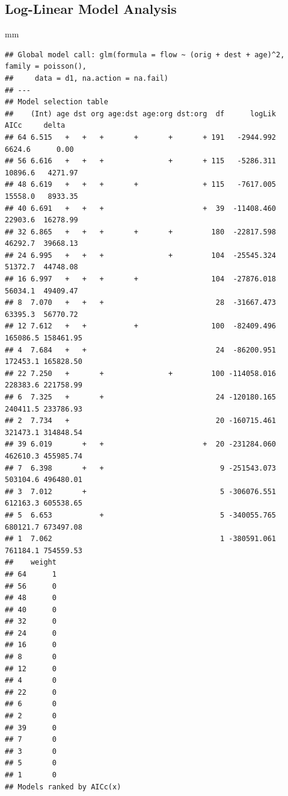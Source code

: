 \documentclass[
]{book}
\newenvironment{Shaded}{\begin{snugshade}}{\end{snugshade}}
\newcommand{\NormalTok}[1]{#1}
\begin{document}
\hypertarget{log-linear-model-analysis-5}{%
\subsection{Log-Linear Model Analysis}\label{log-linear-model-analysis-5}}

\begin{Shaded}
\begin{Highlighting}[]
\NormalTok{mm}
\end{Highlighting}
\end{Shaded}

\begin{verbatim}
## Global model call: glm(formula = flow ~ (orig + dest + age)^2, family = poisson(), 
##     data = d1, na.action = na.fail)
## ---
## Model selection table 
##    (Int) age dst org age:dst age:org dst:org  df      logLik     AICc     delta
## 64 6.515   +   +   +       +       +       + 191   -2944.992   6624.6      0.00
## 56 6.616   +   +   +               +       + 115   -5286.311  10896.6   4271.97
## 48 6.619   +   +   +       +               + 115   -7617.005  15558.0   8933.35
## 40 6.691   +   +   +                       +  39  -11408.460  22903.6  16278.99
## 32 6.865   +   +   +       +       +         180  -22817.598  46292.7  39668.13
## 24 6.995   +   +   +               +         104  -25545.324  51372.7  44748.08
## 16 6.997   +   +   +       +                 104  -27876.018  56034.1  49409.47
## 8  7.070   +   +   +                          28  -31667.473  63395.3  56770.72
## 12 7.612   +   +           +                 100  -82409.496 165086.5 158461.95
## 4  7.684   +   +                              24  -86200.951 172453.1 165828.50
## 22 7.250   +       +               +         100 -114058.016 228383.6 221758.99
## 6  7.325   +       +                          24 -120180.165 240411.5 233786.93
## 2  7.734   +                                  20 -160715.461 321473.1 314848.54
## 39 6.019       +   +                       +  20 -231284.060 462610.3 455985.74
## 7  6.398       +   +                           9 -251543.073 503104.6 496480.01
## 3  7.012       +                               5 -306076.551 612163.3 605538.65
## 5  6.653           +                           5 -340055.765 680121.7 673497.08
## 1  7.062                                       1 -380591.061 761184.1 754559.53
##    weight
## 64      1
## 56      0
## 48      0
## 40      0
## 32      0
## 24      0
## 16      0
## 8       0
## 12      0
## 4       0
## 22      0
## 6       0
## 2       0
## 39      0
## 7       0
## 3       0
## 5       0
## 1       0
## Models ranked by AICc(x)
\end{verbatim}
\end{document}
